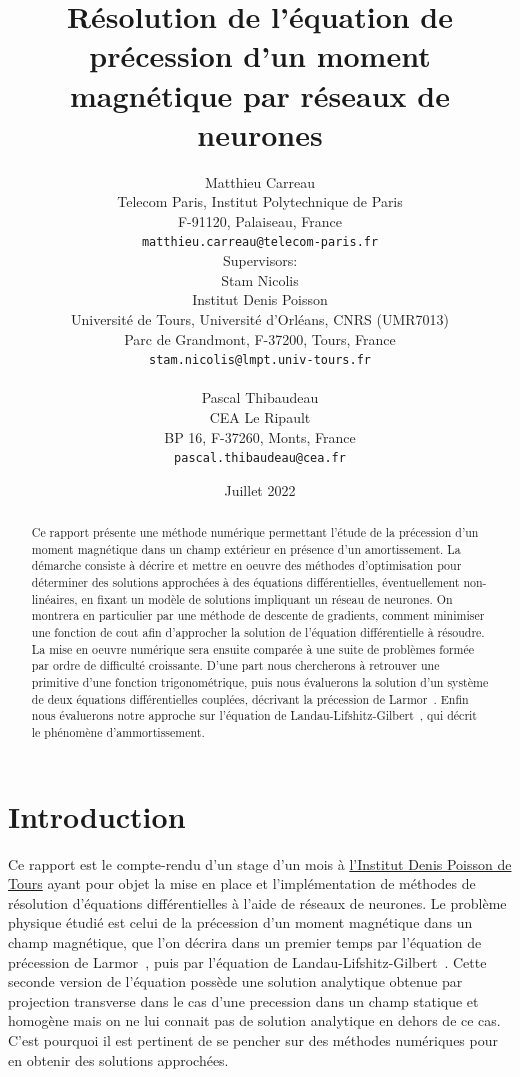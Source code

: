 \documentclass[12pt]{report}
\title{Résolution de l'équation de précession d'un moment magnétique par réseaux de neurones}
\author{
  Matthieu Carreau\\
  Telecom Paris, Institut Polytechnique de Paris\\
  F-91120, Palaiseau, France\\
  \texttt{matthieu.carreau@telecom-paris.fr} \\
  [1em] Supervisors: \\
  Stam Nicolis\\
  Institut Denis Poisson\\
  Université de Tours, Université d'Orléans, CNRS (UMR7013)\\
  Parc de Grandmont, F-37200, Tours, France\\
  \texttt{stam.nicolis@lmpt.univ-tours.fr}\\
  [1em] \\
  Pascal Thibaudeau\\
  CEA Le Ripault\\
  BP 16, F-37260, Monts, France\\
  \texttt{pascal.thibaudeau@cea.fr}
}
\date{Juillet 2022}
\begin{document}
\maketitle

\begin{abstract}
    Ce rapport présente une méthode numérique permettant l'étude de la précession d'un moment magnétique dans un champ extérieur en présence d'un amortissement. 
    La démarche consiste à décrire et mettre en oeuvre des méthodes d'optimisation pour déterminer des solutions approchées à des équations différentielles, éventuellement non-linéaires, en fixant un modèle de solutions impliquant un réseau de neurones. 
    On montrera en particulier par une méthode de descente de gradients, comment minimiser une fonction de cout afin d'approcher la solution de l'équation différentielle à résoudre.
    La mise en oeuvre numérique sera ensuite comparée à une suite de problèmes formée par ordre de difficulté croissante. 
    D'une part nous chercherons à retrouver une primitive d'une fonction trigonométrique, puis nous évaluerons la solution d'un système de deux équations différentielles couplées, décrivant la précession de Larmor~\cite{PrecessionLarmor}.
    Enfin nous évaluerons notre approche sur l'équation de Landau-Lifshitz-Gilbert~\cite{EquationGilbert}, qui décrit le phénomène d'ammortissement.

\end{abstract}
    
\tableofcontents{}

\chapter{Introduction}
\label{Introduction}

Ce rapport est le compte-rendu d'un stage d'un mois à \href{https://www.idpoisson.fr}{l'Institut Denis Poisson de Tours} ayant pour objet la mise en place et l'implémentation de méthodes de résolution d'équations différentielles à l'aide de réseaux de neurones. 
Le problème physique étudié est celui de la précession d'un moment magnétique dans un champ magnétique, que l'on décrira dans un premier temps par l'équation de précession de Larmor~\cite{PrecessionLarmor}, puis par l'équation de Landau-Lifshitz-Gilbert~\cite{EquationGilbert}.
Cette seconde version de l'équation possède une solution analytique obtenue par projection transverse dans le cas d'une precession dans un champ statique et homogène mais on ne lui connait pas de solution analytique en dehors de ce cas.
C'est pourquoi il est pertinent de se pencher sur des méthodes numériques pour en obtenir des solutions approchées.
\end{document}
